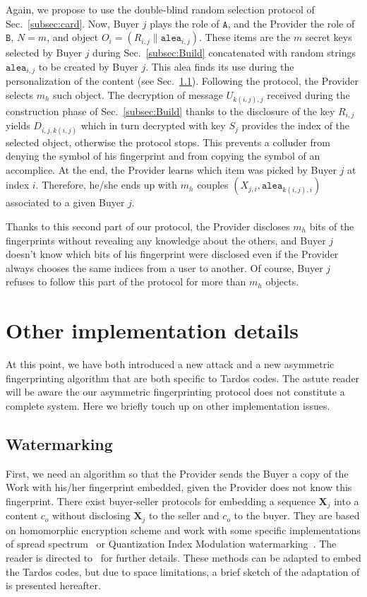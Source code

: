 \documentclass{article}
\begin{document}
Again, we propose to use the double-blind random selection protocol of Sec.~\ref{subsec:card}.
Now, Buyer $j$ plays the role of $\mathtt{A}$, and the Provider the role of
$\mathtt{B}$, $N=m$, and object
$O_{i}=(R_{i,j}\|\mathtt{alea}_{i,j})$. These items are the $m$ secret
keys selected by Buyer $j$ during Sec.~\ref{subsec:Build} concatenated
with random strings $\mathtt{alea}_{i,j}$ to be created by Buyer
$j$. This alea finds its use during the personalization of the content
(see Sec.~\ref{sec:Embed}). Following the protocol, the Provider
selects $m_h$ such object. The decryption of message $U_{k(i,j),j}$
received during the construction phase of Sec.~\ref{subsec:Build}
thanks to the disclosure of the key $R_{i,j}$ yields $D_{i,j,k(i,j)}$
which in turn decrypted with key $S_j$ provides the index of the
selected object, otherwise the protocol stops. This prevents a
colluder from denying the symbol of his fingerprint and from copying
the symbol of an accomplice. At the end, the Provider learns which
item was picked by Buyer $j$ at index $i$. Therefore, he/she ends up with
$m_h$ couples $(X_{j,i},\mathtt{alea}_{k(i,j),i})$ associated to a
given Buyer $j$.

Thanks to this second part of our protocol, the Provider discloses $m_h$ bits of the
fingerprints without revealing any knowledge about the others, and Buyer
$j$ doesn't know which bits of his fingerprint were disclosed even if
the Provider always chooses the same indices from a user to another.
Of course, Buyer $j$ refuses to follow this part of the protocol for more than $m_h$ objects.

\section{Other implementation details}
\label{sec:wmaccuse}

At this point, we have both introduced a new attack and a new
asymmetric fingerprinting algorithm that are both specific to
Tardos codes.  The astute reader will be aware the our asymmetric
fingerprinting protocol does not constitute a complete system.  Here
we briefly touch up on other implementation issues. 

\subsection{Watermarking}
\label{sec:Embed}

First, we need an algorithm so that the
Provider sends the Buyer a copy of the Work with his/her fingerprint embedded,
given the Provider does not know this fingerprint.
There exist buyer-seller
protocols for embedding a sequence $\mathbf{X}_{j}$ into a content
$c_{o}$ without disclosing $\mathbf{X}_{j}$ to the seller and $c_{o}$
to the buyer. They are based on homomorphic encryption scheme and work
with some specific implementations of spread
spectrum~\cite{Kuri08Spread} or Quantization Index Modulation
watermarking~\cite{Deng:2009fk}.  The reader is directed to~\cite{Kuri08Spread,Deng:2009fk} for further details.  These methods
can be adapted to embed the Tardos codes, but due to space limitations,
a brief sketch of the adaptation of \cite{Deng:2009fk} is presented hereafter.
\end{document}

